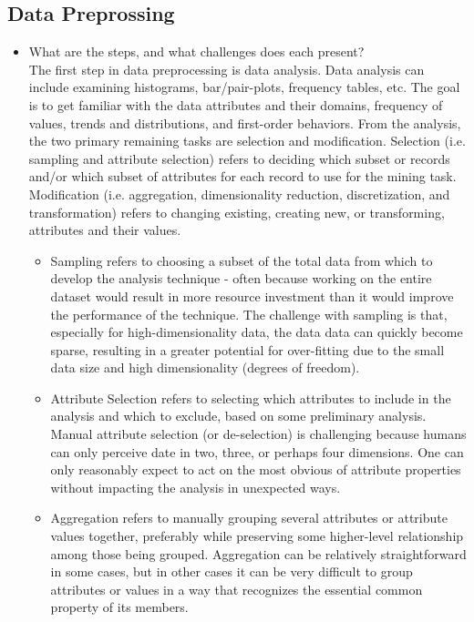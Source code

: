 \documentclass[fleqn,10pt]{SelfArx} %
\begin{document}
\subsection{Data Preprossing}

\begin{itemize}[noitemsep]

\item What are the steps, and what challenges does each present?\\
  The first step in data preprocessing is data analysis.  Data analysis can include examining histograms, bar/pair-plots, frequency tables, etc.  The goal is to get familiar with the data attributes and their domains, frequency of values, trends and distributions, and first-order behaviors.  From the analysis, the two primary remaining tasks are selection and modification.  Selection (i.e. sampling and attribute selection) refers to deciding which subset or records and/or which subset of attributes for each record to use for the mining task.  Modification (i.e. aggregation, dimensionality reduction, discretization, and transformation) refers to changing existing, creating new, or transforming, attributes and their values.

\begin{itemize}
	
	\item Sampling refers to choosing a subset of the total data from which to develop the analysis technique - often because working on the entire dataset would result in more resource investment than it would improve the performance of the technique.  The challenge with sampling is that, especially for high-dimensionality data, the data data can quickly become sparse, resulting in a greater potential for over-fitting due to the small data size and high dimensionality (degrees of freedom).
	
	\item Attribute Selection refers to selecting which attributes to include in the analysis and which to exclude, based on some preliminary analysis.  Manual attribute selection (or de-selection) is challenging because humans can only perceive date in two, three, or perhaps four dimensions.  One can only reasonably expect to act on the most obvious of attribute properties without impacting the analysis in unexpected ways.
	
	\item Aggregation refers to manually grouping several attributes or attribute values together, preferably while preserving some higher-level relationship among those being grouped.  Aggregation can be relatively straightforward in some cases, but in other cases it can be very difficult to group attributes or values in a way that recognizes the essential common property of its members.
	

\end{itemize}
\end{itemize}
\end{document}
